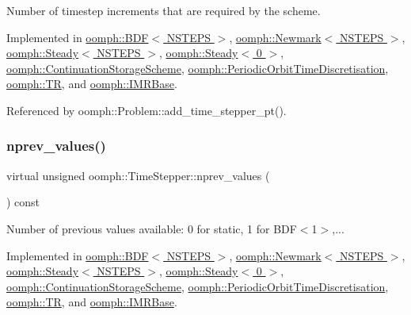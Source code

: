 Number of timestep increments that are required by the scheme. 



Implemented in \hyperlink{classoomph_1_1BDF_a6bfaedcd81cad549615bd21ce4336421}{oomph\+::\+B\+D\+F$<$ N\+S\+T\+E\+P\+S $>$}, \hyperlink{classoomph_1_1Newmark_a47895694925d86886ecd03a7e37906fa}{oomph\+::\+Newmark$<$ N\+S\+T\+E\+P\+S $>$}, \hyperlink{classoomph_1_1Steady_add50fd00901dc87069f2404014d699f7}{oomph\+::\+Steady$<$ N\+S\+T\+E\+P\+S $>$}, \hyperlink{classoomph_1_1Steady_add50fd00901dc87069f2404014d699f7}{oomph\+::\+Steady$<$ 0 $>$}, \hyperlink{classoomph_1_1ContinuationStorageScheme_aedf54b092d3f98b60b49190cb5dad540}{oomph\+::\+Continuation\+Storage\+Scheme}, \hyperlink{classoomph_1_1PeriodicOrbitTimeDiscretisation_ac26b0ab91fc9ec95dad7c207d960216a}{oomph\+::\+Periodic\+Orbit\+Time\+Discretisation}, \hyperlink{classoomph_1_1TR_ac41d1d10629140a3a18da92701d3b5a5}{oomph\+::\+TR}, and \hyperlink{classoomph_1_1IMRBase_a7d7c5c2dedead518b9b0882e74914f54}{oomph\+::\+I\+M\+R\+Base}.



Referenced by oomph\+::\+Problem\+::add\+\_\+time\+\_\+stepper\+\_\+pt().

\mbox{\label{classoomph_1_1TimeStepper_a0f38713ed304c18d9f7b5cf8131664c1}} 
\subsubsection{\texorpdfstring{nprev\+\_\+values()}{nprev\_values()}}
{\footnotesize\ttfamily virtual unsigned oomph\+::\+Time\+Stepper\+::nprev\+\_\+values (\begin{DoxyParamCaption}{ }\end{DoxyParamCaption}) const\hspace{0.3cm}{\ttfamily [pure virtual]}}



Number of previous values available\+: 0 for static, 1 for B\+D\+F$<$1$>$,... 



Implemented in \hyperlink{classoomph_1_1BDF_ae6fac2faf065b8abf2afff64b63874f6}{oomph\+::\+B\+D\+F$<$ N\+S\+T\+E\+P\+S $>$}, \hyperlink{classoomph_1_1Newmark_a4628c97b9f580d0888cb911caf28b54f}{oomph\+::\+Newmark$<$ N\+S\+T\+E\+P\+S $>$}, \hyperlink{classoomph_1_1Steady_acb34aea820a95d50b4dd7a8e92bea91a}{oomph\+::\+Steady$<$ N\+S\+T\+E\+P\+S $>$}, \hyperlink{classoomph_1_1Steady_acb34aea820a95d50b4dd7a8e92bea91a}{oomph\+::\+Steady$<$ 0 $>$}, \hyperlink{classoomph_1_1ContinuationStorageScheme_a895e0f4bc35dc3cae52fcee71db86de3}{oomph\+::\+Continuation\+Storage\+Scheme}, \hyperlink{classoomph_1_1PeriodicOrbitTimeDiscretisation_aff80f0af851d19d3b19cfee5d17022f3}{oomph\+::\+Periodic\+Orbit\+Time\+Discretisation}, \hyperlink{classoomph_1_1TR_ac9b61bc12fc5657d4d5a0797b0097d38}{oomph\+::\+TR}, and \hyperlink{classoomph_1_1IMRBase_a973faf88d44644bde495ffd6b9acbef1}{oomph\+::\+I\+M\+R\+Base}.



